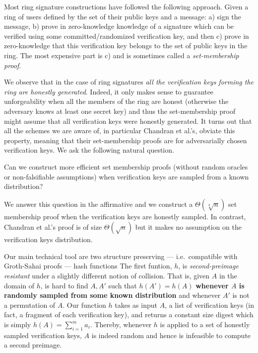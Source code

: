 
Most ring signature constructions have followed the following approach. Given a ring of users defined by the set of their public keys and a message: a) sign the message, b) prove in zero-knowledge knowledge of a signature which can be verified using some committed/randomized verification key, and then c) prove in zero-knowledge that this verification key belongs to the set of public keys in the ring.  The most expensive part is c) and is sometimes called a \emph{set-membership proof}.

We observe that in the case of ring signatures \emph{all the verification keys forming the ring are honestly generated}. 
Indeed, it only makes sense to guarantee unforgeability when all the members of the ring are honest (otherwise the adversary knows at least one secret key) and thus the set-membership proof might assume that all verification keys were honestly generated.
It turns out that all the schemes we are aware of, in particular Chandran et al.'s, obviate this property, meaning that their set-membership proofs are for adversarially chosen verification keys.
We ask the following natural question.
\begin{displayquote}
Can we construct more efficient set membership proofs (without random oracles or non-falsifiable assumptions) when verification keys are sampled from a known distribution?
\end{displayquote}
We answer this question in the affirmative and we construct a $\Theta(\sqrt[3]{n})$ set membership proof when the verification keys are honestly sampled. In contrast, Chandran et al.'s proof is of size $\Theta(\sqrt{n})$ but it makes no assumption on the verification keys distribution.

Our main technical tool are two structure preserving --- i.e.~compatible with Groth-Sahai proofs --- hash functions The first funtion, $h$, is \emph{second-preimage resistant} under a slightly different notion of collision. That is, given $A$ in the domain of $h$, is hard to find $A,A'$ such that $h(A')=h(A)$ {\bf whenever $A$ is randomly sampled from some known distribution} and whenever $A'$ is not a permutation of $A$.
Our function $h$ takes as input $A$, a list of verification keys (in fact, a fragment of each verification key), and returns a constant size digest which is simply $h(A)= \sum_{i=1}^m a_i$. Thereby, whenever $h$ is applied to a set of honestly sampled verification keys, $A$ is indeed random and hence is infeasible to compute a second preimage. 

